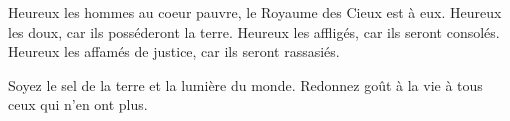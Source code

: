 

Heureux les hommes au coeur pauvre, le Royaume des Cieux est à eux.
Heureux les doux, car ils posséderont la terre.
Heureux les affligés, car ils seront consolés.
Heureux les affamés de justice, car ils seront rassasiés.

Soyez le sel de la terre et la lumière du monde.
Redonnez goût à la vie  à tous ceux qui n’en ont plus.

